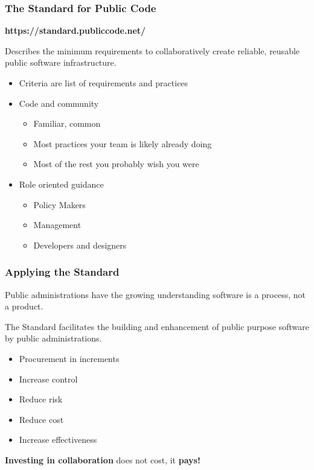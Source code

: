\documentclass{beamer}
\begin{document}
\begin{frame}
\frametitle{The Standard for Public Code}

\textbf{https://standard.publiccode.net/}\newline

Describes the minimum requirements to collaboratively create reliable, reusable
public software infrastructure.\newline

\begin{itemize}
\item Criteria are list of requirements and practices
\item Code and community
\begin{itemize}
\item Familiar, common
\item Most practices your team is likely already doing
\item Most of the rest you probably wish you were
\end{itemize}
\item Role oriented guidance
\begin{itemize}
\item Policy Makers
\item Management
\item Developers and designers
\end{itemize}
\end{itemize}
\end{frame}

\begin{frame}
\frametitle{Applying the Standard}
Public administrations have the growing understanding software is a process,
not a product.\newline

The Standard facilitates the building and enhancement of public
purpose software by public administrations.\newline

\begin{itemize}
\item Procurement in increments
\item Increase control
\item Reduce risk
\item Reduce cost
\item Increase effectiveness\newline
\end{itemize}
\textbf{Investing in collaboration} does not cost, it \textbf{pays!}
\end{frame}
\end{document}
